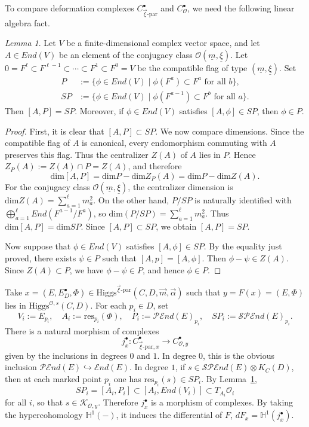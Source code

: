 \documentclass[11pt]{amsart}
\theoremstyle{plain}
\theoremstyle{definition}
\theoremstyle{remark}
\newtheorem{lemma}[theorem]{Lemma}
\newcommand{\End}{\mathcal E nd}
\newcommand{\HH}{\mathbb H}
\newcommand{\PEnd}{\mathcal P\!\End}
\newcommand{\SPEnd}{\mathcal{SP}\!\End}
\newcommand{\cO}{\mathcal O}
\newcommand{\cK}{\mathcal K}
\newcommand{\Higgs}{\mathrm{Higgs}}
\def\dim{\mathrm{dim}}
\def\res{\mathrm{res}}
\def\uxi{{\underline{\xi}}}
\def\vxi{\vec{\xi}}
\def\um{{\underline{m}}}
\begin{document}
To compare deformation complexes $C_{\vxi\text{-par}}^\bullet$ and $C_{\cO}^\bullet$, we need the following linear algebra fact. 
\begin{lemma}\label{lem:local-linear-algebra-injective}
Let $V$ be a finite-dimensional complex vector space, and let
$A\in End(V)$ be an element of the conjugacy class $\cO(\um,\uxi)$. Let $
0=F^\ell\subset F^{\ell-1}\subset\cdots\subset F^1\subset F^0=V$
be the compatible flag of type $(\um,\uxi)$. Set
\[
\begin{aligned}
    P&:=\{\phi\in End(V)\mid \phi(F^a)\subset F^a\text{ for all }b\}, \\
    SP&:=\{\phi\in End(V)\mid \phi(F^{a-1})\subset F^b\text{ for all }a\}.
\end{aligned}
\]
Then $[A,P]=SP$. Moreover, if $\phi\in End(V)$ satisfies $[A,\phi]\in SP$, then $\phi\in P$.
\end{lemma}

\begin{proof}
First, it is clear that $[A,P]\subset SP$. We now compare dimensions. Since the compatible flag of $A$ is canonical, every
endomorphism commuting with $A$ preserves this flag. Thus the centralizer $Z(A)$ of $A$ lies in $P$. Hence
$Z_P(A):=Z(A) \cap P = Z(A)$, and therefore
\[
\dim [A,P]=\dim P-\dim Z_P(A)=\dim P-\dim Z(A).
\]
For the conjugacy class $\cO(\um,\uxi)$, the centralizer dimension is $
\dim Z(A)=\sum_{a=1}^{\ell}m_a^2$. 
On the other hand, $P/SP$ is naturally identified with
$\bigoplus_{a=1}^{\ell} End(F^{a-1}/F^a)$, so $
\dim(P/SP)=\sum_{a=1}^{\ell}m_a^2.$
Thus $
\dim [A,P]=\dim SP$. Since $[A,P]\subset SP$, we obtain $[A,P]=SP$.

Now suppose that $\phi\in End(V)$ satisfies $[A,\phi]\in SP$. By the equality just
proved, there exists $\psi\in P$ such that $
[A,p]=[A,\phi]$. Then $\phi-\psi\in Z(A)$. Since $Z(A)\subset P$, we have $\phi-\psi\in P$, and hence $\phi\in P$.
\end{proof}

Take
$x=(E,E_D^\bullet,\Phi)\in \Higgs^{\vec\xi\text{-par}}(C,D,\vec m,\vec\alpha)$
such that
$y=F(x)=(E,\Phi)$ lies in $\Higgs^{\cO,s}(C,D)$. For each $p_i\in D$, set 
\[V_i:=E_{p_i}, \quad A_i:= \res_{p_i}(\Phi),\quad P_i := \PEnd(E)_{p_i}, \quad SP_i:= \SPEnd(E)_{p_i}.\]
There is a natural morphism of complexes
\[
j_x^\bullet:C_{\vxi\text{-par},x}^\bullet\longrightarrow C_{\cO,y}^\bullet
\]
given by the inclusions in degrees $0$ and $1$. In degree $0$, this is the obvious inclusion
$\PEnd(E)\hookrightarrow\End(E)$. In degree $1$, if
$s\in\SPEnd(E)\otimes K_C(D)$, then at each marked point $p_i$ one has
$\res_{p_i}(s)\in SP_i$. By Lemma~\ref{lem:local-linear-algebra-injective},
\[SP_i = [A_i,P_i] \subset [A_i,End(V_i)]\subset T_{A_i}\cO_i\]
for all $i$, so that $s\in\cK_{\cO,y}$. Therefore $j_x^\bullet$ is a morphism of complexes. By taking the hypercohomology $\HH^1(-)$, it induces the differential of $F$, $dF_x=\HH^1(j_x^\bullet)$. 
\end{document}
